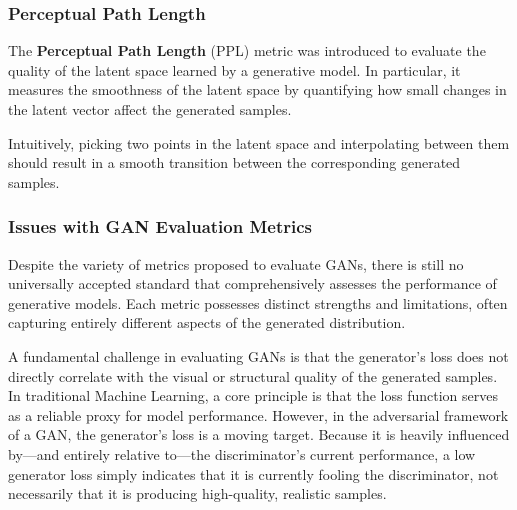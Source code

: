 \subsubsection{Perceptual Path Length}

The \textbf{Perceptual Path Length} (PPL) metric was introduced to evaluate the quality of the latent space learned by a generative model.
In particular, it measures the smoothness of the latent space by quantifying how small changes in the latent vector affect the generated samples.

Intuitively, picking two points in the latent space and interpolating between them should result in a smooth transition between the corresponding generated samples.

\subsubsection{Issues with GAN Evaluation Metrics}
Despite the variety of metrics proposed to evaluate GANs, there is still no universally accepted standard that comprehensively assesses the performance of generative models. Each metric possesses distinct strengths and limitations, often capturing entirely different aspects of the generated distribution. 

A fundamental challenge in evaluating GANs is that the generator's loss does not directly correlate with the visual or structural quality of the generated samples. In traditional Machine Learning, a core principle is that the loss function serves as a reliable proxy for model performance. However, in the adversarial framework of a GAN, the generator's loss is a moving target. Because it is heavily influenced by—and entirely relative to—the discriminator's current performance, a low generator loss simply indicates that it is currently fooling the discriminator, not necessarily that it is producing high-quality, realistic samples.


